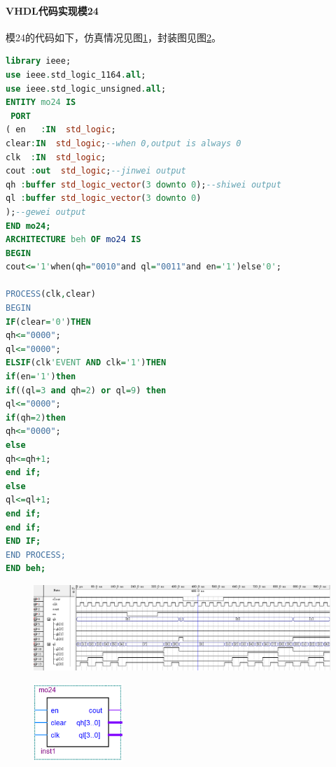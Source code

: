 \documentclass[12pt]{article}
\begin{document}
\paragraph{VHDL代码实现模24}模24的代码如下，仿真情况见图\ref{fig:fangzhenmo24}，封装图见图\ref{fig:fengzhuangmo24}。
\begin{lstlisting}[language=VHDL]
library ieee;
use ieee.std_logic_1164.all;
use ieee.std_logic_unsigned.all;
ENTITY mo24 IS 
 PORT
( en   :IN  std_logic;
clear:IN  std_logic;--when 0,output is always 0
clk  :IN  std_logic;
cout :out  std_logic;--jinwei output
qh :buffer std_logic_vector(3 downto 0);--shiwei output
ql :buffer std_logic_vector(3 downto 0)
);--gewei output
END mo24;
ARCHITECTURE beh OF mo24 IS
BEGIN
cout<='1'when(qh="0010"and ql="0011"and en='1')else'0'; 

PROCESS(clk,clear)
BEGIN
IF(clear='0')THEN
qh<="0000";
ql<="0000";
ELSIF(clk'EVENT AND clk='1')THEN
if(en='1')then
if((ql=3 and qh=2) or ql=9) then
ql<="0000";
if(qh=2)then
qh<="0000";
else
qh<=qh+1;
end if;
else
ql<=ql+1;
end if;
end if;
END IF;
END PROCESS;
END beh;
\end{lstlisting} 
\begin{figure}[hp]
	\centering  
	\includegraphics[width=\textwidth]{picture/TIM20181210203225.png} 
	\caption{}
	\label{fig:fangzhenmo24}   
\end{figure}
\begin{figure}[hp]
	\centering  
	\includegraphics[width=0.3\textwidth]{picture/fenzhuangmo24.png} 
	\caption{}
	\label{fig:fengzhuangmo24}   
\end{figure}\par
\end{document}
